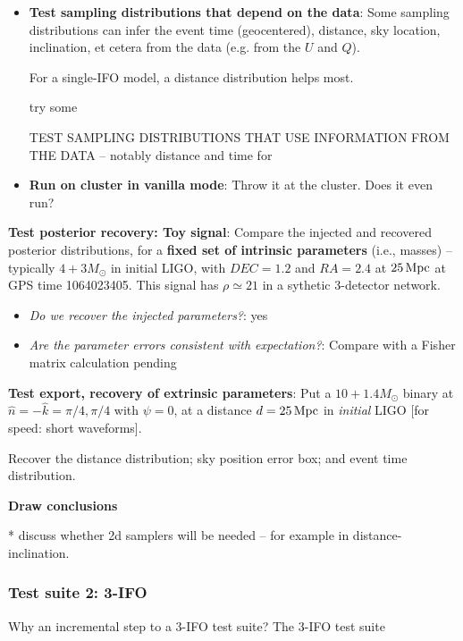\documentclass[twocolumn,prd,nofootinbib]{revtex4}
\newcommand\editremark[1]{{\color{red} #1}}
\newcommand\unit[1]{\, {\rm #1}}
\begin{document}
\begin{widetext}
\begin{widetext}
\begin{itemize}
\item  \textbf{Test sampling distributions that depend on the data}: Some sampling distributions can infer the event
  time (geocentered), distance, sky location, inclination, et cetera from the data (e.g. from the $U$ and $Q$).  

For a single-IFO model, a distance distribution helps most.

\editremark{try some}

\editremark{TEST SAMPLING DISTRIBUTIONS THAT USE INFORMATION FROM THE DATA} -- notably distance and time for 

\item \textbf{Run on cluster in vanilla mode}: Throw it at the cluster.  Does it even run?
\end{itemize}


\noindent \textbf{Test posterior recovery: Toy signal}: Compare the injected and recovered posterior distributions, for a
\textbf{fixed set of intrinsic parameters} (i.e., masses) -- typically $4+3 M_\odot$ in initial LIGO, with $DEC=1.2$ and
$RA=2.4$ at $25\unit{Mpc}$ at GPS time 1064023405.  This signal has $\rho \simeq 21$ in a sythetic 3-detector network.
\begin{itemize}
\item \emph{Do we recover the injected parameters?}: \editremark{yes}
\item \emph{Are the parameter errors consistent with expectation?}: Compare with a Fisher matrix calculation \editremark{pending}
\end{itemize}

\noindent \textbf{Test export, recovery of extrinsic parameters}: Put a $10+1.4 M_\odot$ binary  at
$\hat{n}=-\hat{k}=\pi/4,\pi/4$ with $\psi=0$, at a distance $d=25\unit{Mpc}$ in \emph{initial} LIGO [for speed: short
  waveforms].  

Recover the distance distribution;  sky position error box; and event time distribution.



\noindent \textbf{Draw conclusions}


* discuss whether 2d samplers will be needed -- for example in distance-inclination.

\subsubsection{Test suite 2: 3-IFO }
Why an incremental step to a 3-IFO test suite?  The 3-IFO test suite



\end{widetext}
\end{widetext}
\end{document}
